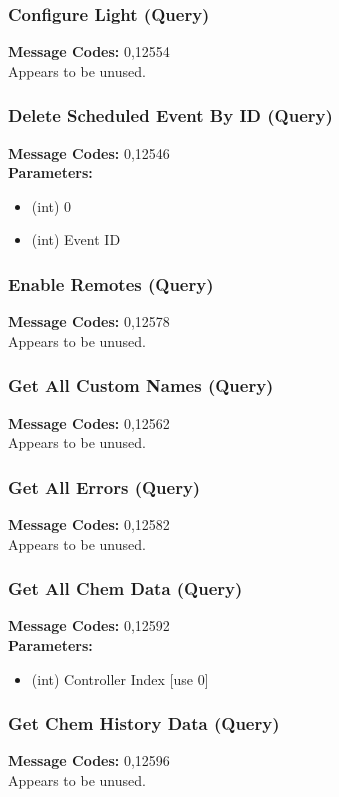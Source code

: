 \documentclass[11pt]{article}
\begin{document}
\subsubsection{Configure Light (Query)}
\label{msg:12554}
{\bf Message Codes: } 0,12554\\
Appears to be unused.

\subsubsection{Delete Scheduled Event By ID (Query)}
\label{msg:12546}
{\bf Message Codes: } 0,12546\\
{\bf Parameters: }
\small
\begin{itemize}
\item (int) 0
\item (int) Event ID
\end{itemize}
\normalsize

\subsubsection{Enable Remotes (Query)}
\label{msg:12578}
{\bf Message Codes: } 0,12578\\
Appears to be unused.

\subsubsection{Get All Custom Names (Query)}
\label{msg:12562}
{\bf Message Codes: } 0,12562\\
Appears to be unused.

\subsubsection{Get All Errors (Query)}
\label{msg:12582}
{\bf Message Codes: } 0,12582\\
Appears to be unused.

\subsubsection{Get All Chem Data (Query)}
\label{msg:12592}
{\bf Message Codes: } 0,12592\\
{\bf Parameters: }
\small
\begin{itemize}
\item (int) Controller Index [use 0]
\end{itemize}
\normalsize

\subsubsection{Get Chem History Data (Query)}
\label{msg:12596}
{\bf Message Codes: } 0,12596\\
Appears to be unused.
\end{document}
